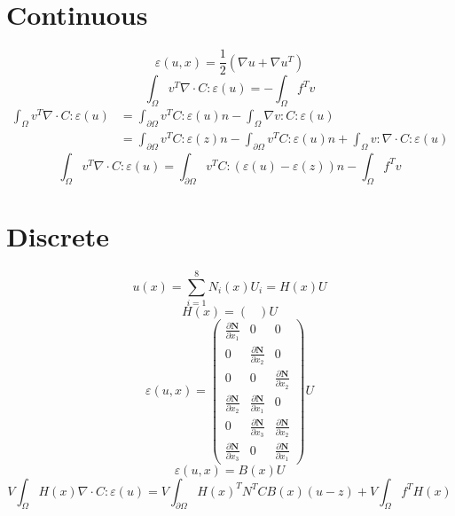 \documentclass{article}
\begin{document}
\section{Continuous}
	\[\varepsilon(u,x) = \frac{1}{2}(\nabla u + \nabla u^T)\]
	\[\int_{\Omega} v^T\nabla\cdot C:\varepsilon(u) = -\int_{\Omega}f^Tv\]
	\begin{align}
	\int_{\Omega} v^T\nabla\cdot C:\varepsilon(u) &= \int_{\partial \Omega} v^TC:\varepsilon(u)n- \int_{\Omega} \nabla v:C:\varepsilon(u) \\
	&= \int_{\partial \Omega} v^TC:\varepsilon(z)n - \int_{\partial \Omega} v^TC:\varepsilon(u)n + \int_{\Omega} v:\nabla\cdot C:\varepsilon(u)
	\end{align}
	\[\int_{\Omega} v^T\nabla\cdot C:\varepsilon(u) =  \int_{\partial \Omega} v^TC:(\varepsilon(u)-\varepsilon(z))n - \int_{\Omega}f^Tv\]
	
\section{Discrete}
	\[u(x)=\sum_{i=1}^{8}N_i(x)U_i = H(x)U\]
	\[H(x) = \begin{pmatrix}
	
	\end{pmatrix}U\]
	\[\varepsilon(u,x) = \begin{pmatrix}
	  \frac{\partial \mathbf{N}}{\partial x_1} & 0 & 0\\
	  0 & \frac{\partial \mathbf{N}}{\partial x_2} & 0\\
	  0 & 0 & \frac{\partial \mathbf{N}}{\partial x_2}\\
 	  \frac{\partial \mathbf{N}}{\partial x_2} & \frac{\partial \mathbf{N}}{\partial x_1} & 0\\
  	  0 & \frac{\partial \mathbf{N}}{\partial x_3} & \frac{\partial \mathbf{N}}{\partial x_2}\\
  	  \frac{\partial \mathbf{N}}{\partial x_3} & 0 & \frac{\partial \mathbf{N}}{\partial x_1}
	\end{pmatrix}U\]
	\[\varepsilon(u,x) = B(x)U\]
	\[V\int_{\Omega}H(x) \nabla\cdot C:\varepsilon(u) =  V\int_{\partial \Omega} H(x)^TN^TCB(x)(u-z) + V\int_{\Omega}f^TH(x)\]
	
\end{document}
